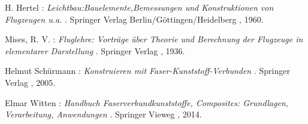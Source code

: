 \begin{thebibliography}{99}          
	H. Hertel :
	\textit { Leichtbau:Bauelemente,Bemessungen und Konstruktionen von Flugzeugen u.a. }.
	Springer Verlag Berlin/Göttingen/Heidelberg , 1960.
	
	Mises, R. V. :
	\textit { Fluglehre: Vorträge über Theorie und Berechnung der Flugzeuge in elementarer Darstellung }.
	Springer Verlag , 1936.
	
	Helmut Schürmann :
	\textit { Konstruieren mit Faser-Kunststoff-Verbunden }.
	Springer Verlag , 2005.
	
	Elmar Witten :
	\textit { Handbuch Faserverbundkunststoffe, Composites: Grundlagen, Verarbeitung, Anwendungen }.
	Springer Vieweg , 2014.
	




	
	
\end{thebibliography}